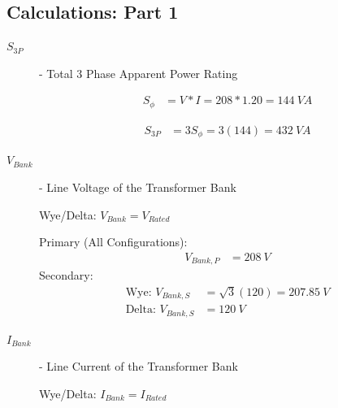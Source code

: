 \subsection{Calculations: Part 1}
\begin{description}

\begin{description}

	\item[$S_{3P}$] - Total 3 Phase Apparent Power Rating
	      \begin{center}
		      \begin{align*}
			      S_{\phi} & =  V * I = 208 * 1.20 = 144 \ VA
		      \end{align*}
	      \end{center}
	      \begin{center}
		      \begin{align*}
			      S_{3P} & = 3S_{\phi} = 3(144) = 432 \ VA
		      \end{align*}
	      \end{center}

	\item[$V_{Bank}$] - Line Voltage of the Transformer Bank
	      \begin{center}
		      Wye/Delta: $V_{Bank} = V_{Rated}$
	      \end{center}

	      \begin{center}
		      Primary (All Configurations):
		      \begin{align*}
			      V_{Bank,P} & = 208 \ V
		      \end{align*}
		      Secondary:
		      \begin{align*}
			      \text{Wye: } V_{Bank,S}   & = \sqrt{3}(120) = 207.85 \ V \\
			      \text{Delta: } V_{Bank,S} & = 120 \ V
		      \end{align*}
	      \end{center}

	\item[$I_{Bank}$] - Line Current of the Transformer Bank
	      \begin{center}
		      Wye/Delta: $I_{Bank} = I_{Rated}$
	      \end{center}


\end{description}
\end{description}
